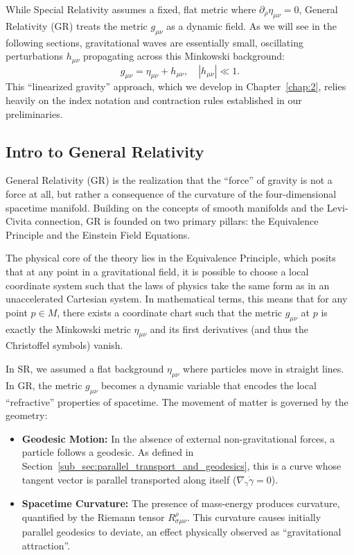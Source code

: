 While Special Relativity assumes a fixed, flat metric where $\partial_\rho \eta_{\mu\nu} = 0$, General Relativity (GR) treats the metric $g_{\mu\nu}$ as a dynamic field. As we will see in the following sections, gravitational waves are essentially small, oscillating perturbations $h_{\mu\nu}$ propagating across this Minkowski background:
\[%
  g_{\mu\nu} = \eta_{\mu\nu} + h_{\mu\nu}, \quad |h_{\mu\nu}| \ll 1
.\]%
This ``linearized gravity'' approach, which we develop in Chapter~\ref{chap:2}, relies heavily on the index notation and contraction rules established in our preliminaries.

\subsection{Intro to General Relativity} General Relativity (GR) is the realization that the ``force'' of gravity is not a force at all, but rather a consequence of the curvature of the four-dimensional spacetime manifold. Building on the concepts of smooth manifolds and the Levi-Civita connection, GR is founded on two primary pillars: the Equivalence Principle and the Einstein Field Equations.

The physical core of the theory lies in the Equivalence Principle, which posits that at any point in a gravitational field, it is possible to choose a local coordinate system such that the laws of physics take the same form as in an unaccelerated Cartesian system. In mathematical terms, this means that for any point $p \in M$, there exists a coordinate chart such that the metric $g_{\mu\nu}$ at $p$ is exactly the Minkowski metric $\eta_{\mu\nu}$ and its first derivatives (and thus the Christoffel symbols) vanish.

In SR, we assumed a flat background $\eta_{\mu\nu}$ where particles move in straight lines. In GR, the metric $g_{\mu\nu}$ becomes a dynamic variable that encodes the local ``refractive'' properties of spacetime. The movement of matter is governed by the geometry:
\begin{itemize}
  \item \textbf{Geodesic Motion:} In the absence of external non-gravitational forces, a particle follows a geodesic. As defined in Section~\ref{sub_sec:parallel_transport_and_geodesics}, this is a curve whose tangent vector is parallel transported along itself ($\nabla_{\dot{\gamma}}\dot{\gamma} = 0$).
  \item \textbf{Spacetime Curvature:} The presence of mass-energy produces curvature, quantified by the Riemann tensor $R^{\rho}_{\sigma\mu\nu}$. This curvature causes initially parallel geodesics to deviate, an effect physically observed as ``gravitational attraction''.
\end{itemize}


